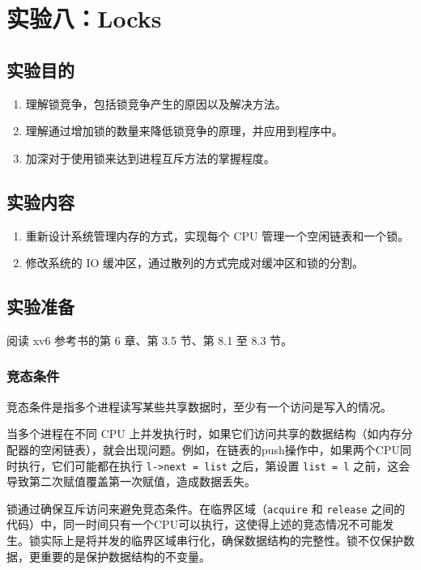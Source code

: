 \section{实验八：Locks}\label{sec:Locks}

\subsection{实验目的}

\begin{enumerate}
	\item 理解锁竞争，包括锁竞争产生的原因以及解决方法。
	\item 理解通过增加锁的数量来降低锁竞争的原理，并应用到程序中。
	\item 加深对于使用锁来达到进程互斥方法的掌握程度。 
\end{enumerate}

\subsection{实验内容}

\begin{enumerate}
	\item 重新设计系统管理内存的方式，实现每个 CPU 管理一个空闲链表和一个锁。
	\item 修改系统的 IO 缓冲区，通过散列的方式完成对缓冲区和锁的分割。 
\end{enumerate}

\subsection{实验准备}

阅读 xv6 参考书的第 6 章、第 3.5 节、第 8.1 至 8.3 节。

\subsubsection{竞态条件}

竞态条件是指多个进程读写某些共享数据时，至少有一个访问是写入的情况。

当多个进程在不同 CPU 上并发执行时，如果它们访问共享的数据结构（如内存分配器的空闲链表），就会出现问题。例如，在链表的push操作中，如果两个CPU同时执行，它们可能都在执行 \texttt{l->next = list} 之后，第设置 \texttt{list = l} 之前，这会导致第二次赋值覆盖第一次赋值，造成数据丢失。

锁通过确保互斥访问来避免竞态条件。在临界区域（\texttt{acquire} 和 \texttt{release} 之间的代码）中，同一时间只有一个CPU可以执行，这使得上述的竞态情况不可能发生。锁实际上是将并发的临界区域串行化，确保数据结构的完整性。锁不仅保护数据，更重要的是保护数据结构的不变量。

